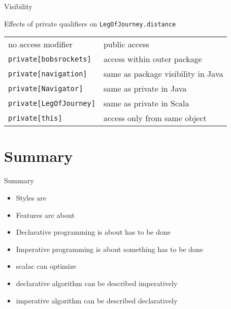 \begin{frame}[fragile]{Visibility}
\begin{block}{Effects of private qualifiers on \lstinline!LegOfJourney.distance!}
\begin{tabular}{l|l}
no access modifier & public access \\
\lstinline!private[bobsrockets]! & access within outer package \\
\lstinline!private[navigation]! & same as package visibility in Java \\
\lstinline!private[Navigator]! & same as private in Java \\
\lstinline!private[LegOfJourney]! & same as private in Scala \\
\lstinline!private[this]! & access only from same object \\
\end{tabular}
\end{block}
\end{frame}

\section{Summary}
\begin{frame}[fragile]{Summary}
\begin{itemize}
  \item Styles are 
  \item Features are about 
  \item Declarative programming is about  has to be done
  \item Imperative programming is about  something has to be done
  \item scalac can optimize 
  \item {} declarative algorithm can be described imperatively
  \item {} imperative algorithm can be described declaratively
\end{itemize}
\end{frame}

